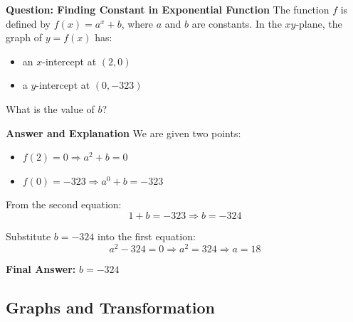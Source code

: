 \documentclass{beamer}
\begin{document}
\begin{frame}{\textbf{Question: Finding Constant in Exponential Function}}
The function $f$ is defined by $f(x) = a^x + b$, where $a$ and $b$ are constants. In the $xy$-plane, the graph of $y = f(x)$ has:
\begin{itemize}
    \item an $x$-intercept at $(2, 0)$
    \item a $y$-intercept at $(0, -323)$
\end{itemize}
What is the value of $b$?
\end{frame}


\begin{frame}{\textbf{Answer and Explanation}}
We are given two points:
\begin{itemize}
    \item $f(2) = 0 \Rightarrow a^2 + b = 0$
    \item $f(0) = -323 \Rightarrow a^0 + b = -323$
\end{itemize}

From the second equation:
\[
1 + b = -323 \Rightarrow b = -324
\]

Substitute $b = -324$ into the first equation:
\[
a^2 - 324 = 0 \Rightarrow a^2 = 324 \Rightarrow a = 18
\]

\textbf{Final Answer:} \(b = -324\)
\end{frame}
\begin{frame}
\section{Graphs and Transformation}
\end{frame}
\end{document}
